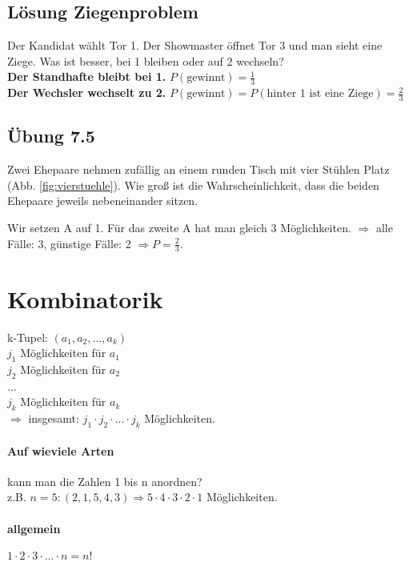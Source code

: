 \renewcommand{\ldate}{2015-10-19}

\subsection{Lösung Ziegenproblem}
Der Kandidat wählt Tor 1. Der Showmaster öffnet Tor 3 und man sieht eine Ziege. Was ist besser, bei 1 bleiben oder auf 2 wechseln? \\
\textbf{Der Standhafte bleibt bei 1.} $ P(\textrm{gewinnt}) = \frac{1}{3} $\\
\textbf{Der Wechsler wechselt zu 2.} $ P(\textrm{gewinnt}) = P(\textrm{hinter 1 ist eine Ziege}) = \frac{2}{3} $\\

\subsection{Übung 7.5} 
Zwei Ehepaare nehmen zufällig an einem runden Tisch mit vier Stühlen Platz (Abb. \ref{fig:vierstuehle}). Wie groß ist die Wahrscheinlichkeit, dass die beiden Ehepaare jeweils nebeneinander sitzen. 

Wir setzen A auf 1. Für das zweite A hat man gleich 3 Möglichkeiten. $\Rightarrow $ alle Fälle: 3, günstige Fälle: 2 $\Rightarrow P=\frac{2}{3}$.

\section{Kombinatorik}
k-Tupel: $ (a_1, a_2, ..., a_k)$\\
$j_1$ Möglichkeiten für $a_1$\\
$j_2$ Möglichkeiten für $a_2$\\
...\\
$j_k$ Möglichkeiten für $a_k$\\
$\Rightarrow$ insgesamt: $j_1\cdot j_2 \cdot ... \cdot j_k$ Möglichkeiten. 

\paragraph{Auf wieviele Arten} kann man die Zahlen 1 bis n anordnen?\\
z.B. $n=5 : (2,1,5,4,3) \Rightarrow 5\cdot 4\cdot 3\cdot 2\cdot 1 $ Möglichkeiten.

\paragraph{allgemein} $1\cdot 2\cdot 3\cdot ... \cdot n = n!$

